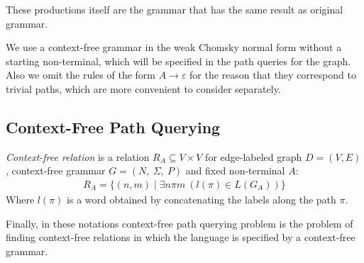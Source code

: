 These productions itself are the grammar that has the same result as original grammar.

We use a context-free grammar in the weak Chomsky normal form without a starting non-terminal, which will be specified in the path queries for the graph. Also we omit the rules of the form $A \rightarrow \varepsilon$ for the reason that they correspond to trivial paths, which are more convenient to consider separately.

\subsection{Context-Free Path Querying}

\begin{definition}\emph{Context-free relation} is a relation $R_A \subseteq V \times V$ for edge-labeled graph $D = (V, E)$, context-free grammar $G = (N,~\Sigma,~P)$ and fixed non-terminal $A$:
\begin{align*}
     R_A = \{(n, m) \mid \exists n \pi m~(l(\pi) \in L(G_A))\}
\end{align*}
Where $l(\pi)$ is a word obtained by concatenating the labels along the path $\pi$.
\end{definition}

Finally, in these notations context-free path querying problem is the problem of finding context-free relations in which the language is specified by a context-free grammar.
 
